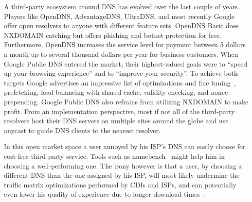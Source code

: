 A third-party ecosystem around DNS has evolved over the last couple of years.
Players like OpenDNS, AdvantageDNS, UltraDNS, and most recently Google offer
open resolvers to anyone with different feature sets. OpenDNS Basic does
NXDOMAIN catching but offers phishing and botnet protection for free.
Furthermore, OpenDNS increases the service level for payment between 5 dollars
a month up to several thousand dollars per year for business customers. When
Google Public DNS entered the market, their highest-valued goals were to
``speed up your browsing experience'' and to ``improve your security''. To
achieve both targets Google advertises an impressive list of optimizations and
fine tuning~\cite{googledns}, \eg prefetching, load balancing with shared
cache, validity checking, and nonce prepending. Google Public DNS also refrains
from utilizing NXDOMAIN to make profit. From an implementation perspective,
most if not all of the third-party resolvers host their DNS servers on multiple
sites around the globe and use anycast to guide DNS clients to the nearest
resolver.

In this open market space a user annoyed by his ISP's DNS can easily choose for
cost-free third-party service.  Tools such as namebench~\cite{namebench} might
help him in choosing a well-performing one. The irony however is that a user,
by choosing a different DNS than the one assigned by his ISP, will most likely
undermine the traffic matrix optimizations performed by CDIs and ISPs, and can
potentially even lower his quality of experience due to longer download
times~\cite{DNS-IMC-2010}.
